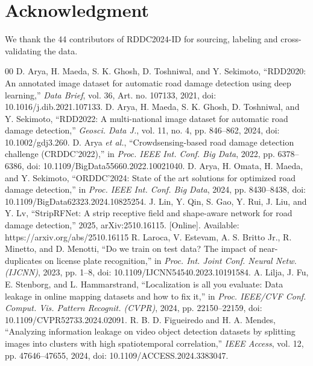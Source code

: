 \documentclass[conference,a4paper]{IEEEtran}
\begin{document}
\section*{Acknowledgment}
We thank the 44 contributors of RDDC2024-ID for sourcing, labeling and cross-validating the data. %

\begin{thebibliography}{00}
 D. Arya, H. Maeda, S. K. Ghosh, D. Toshniwal, and Y. Sekimoto, ``RDD2020: An annotated image dataset for automatic road damage detection using deep learning,'' \textit{Data Brief}, vol. 36, Art. no. 107133, 2021, doi: 10.1016/j.dib.2021.107133.
 D. Arya, H. Maeda, S. K. Ghosh, D. Toshniwal, and Y. Sekimoto, ``RDD2022: A multi-national image dataset for automatic road damage detection,'' \textit{Geosci. Data J.}, vol. 11, no. 4, pp. 846--862, 2024, doi: 10.1002/gdj3.260.
 D. Arya \textit{et al.}, ``Crowdsensing-based road damage detection challenge (CRDDC'2022),'' in \textit{Proc. IEEE Int. Conf. Big Data}, 2022, pp. 6378--6386, doi: 10.1109/BigData55660.2022.10021040.
 D. Arya, H. Omata, H. Maeda, and Y. Sekimoto, ``ORDDC'2024: State of the art solutions for optimized road damage detection,'' in \textit{Proc. IEEE Int. Conf. Big Data}, 2024, pp. 8430--8438, doi: 10.1109/BigData62323.2024.10825254.
 J. Lin, Y. Qin, S. Gao, Y. Rui, J. Liu, and Y. Lv, ``StripRFNet: A strip receptive field and shape-aware network for road damage detection,'' 2025, arXiv:2510.16115. [Online]. Available: https://arxiv.org/abs/2510.16115
 R. Laroca, V. Estevam, A. S. Britto Jr., R. Minetto, and D. Menotti, ``Do we train on test data? The impact of near-duplicates on license plate recognition,'' in \textit{Proc. Int. Joint Conf. Neural Netw. (IJCNN)}, 2023, pp. 1--8, doi: 10.1109/IJCNN54540.2023.10191584.
 A. Lilja, J. Fu, E. Stenborg, and L. Hammarstrand, ``Localization is all you evaluate: Data leakage in online mapping datasets and how to fix it,'' in \textit{Proc. IEEE/CVF Conf. Comput. Vis. Pattern Recognit. (CVPR)}, 2024, pp. 22150--22159, doi: 10.1109/CVPR52733.2024.02091.
 R. B. D. Figueiredo and H. A. Mendes, ``Analyzing information leakage on video object detection datasets by splitting images into clusters with high spatiotemporal correlation,'' \textit{IEEE Access}, vol. 12, pp. 47646--47655, 2024, doi: 10.1109/ACCESS.2024.3383047.

\end{thebibliography}
\end{document}
